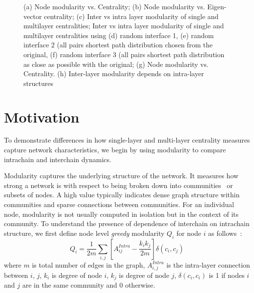 \documentclass[10pt,letterpaper]{article}
\begin{document}
\begin{figure}[h!]
\begin{minipage}[b]{0.25\linewidth}
		\subcaption{}
	\end{minipage}
	\caption{(a) Node modularity vs. Centrality; (b) Node modularity vs. Eigen-vector centrality; (c) Inter vs intra layer modularity of single and multilayer centralities; Inter vs intra layer modularity of single and multilayer centralities using (d) random interface 1, (e) random interface 2 (all pairs shortest path distribution chosen from the original, (f) random interface 3 (all pairs shortest path distribution as close as possible with the original; (g) Node modularity vs. Centrality. (h) Inter-layer modularity depends on intra-layer structures \label{fig:modvcen}}
\end{figure}

\section*{Motivation}
To demonstrate differences in how single-layer and multi-layer centrality measures capture network characteristics, we begin by using modularity to compare intrachain and interchain dynamics. 

Modularity captures the underlying structure of the network. It measures how strong a network is with respect to being broken down into communities~\cite{newman2006mod} or subsets of nodes. A high value typically indicates dense graph structure within communities and sparse connections between communities.  For an individual node, modularity is not usually computed in isolation but in the context of its community. To understand the presence of dependence of interchain on intrachain structure, we first define node level {\it greedy} modularity $Q_i$ for node $i$ as follows~\cite{newman2006mod,newman2006nw,reichardt2006commu,newman2004commu,newman2012nws,newman2004greedy}:
\begin{equation}
\label{eqn1}
Q_i = \frac{1}{2m} \sum_{i,j} \left[A_{ij}^{Intra} - \frac{k_i k_j}{2m} \right] \delta(c_i, c_j)
\end{equation}
where $m$ is total number of edges in the graph, $A_{i,j}^{Intra}$ is the intra-layer connection between $i$, $j$, $k_i$ is degree of node $i$, $k_j$ is degree of node $j$, $\delta(c_i, c_i)$ is 1 if nodes $i$ and $j$ are in the same community and 0 otherwise. 
\end{document}
